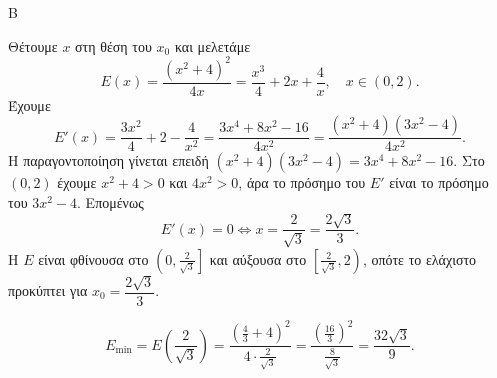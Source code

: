 \begin{thema}{Β}
\begin{erwthma}
\item Θέτουμε $x$ στη θέση του $x_0$ και μελετάμε
\[
E(x)=\frac{(x^2+4)^2}{4x}=\frac{x^3}{4}+2x+\frac4x,\quad x\in(0,2).
\]
Έχουμε
\[
E'(x)=\frac{3x^2}{4}+2-\frac{4}{x^2}
=\frac{3x^4+8x^2-16}{4x^2}
=\frac{(x^2+4)(3x^2-4)}{4x^2}.
\]
Η παραγοντοποίηση γίνεται επειδή $(x^2+4)(3x^2-4)=3x^4+8x^2-16$. Στο $(0,2)$ έχουμε $x^2+4>0$ και $4x^2>0$, άρα το πρόσημο του $E'$ είναι το πρόσημο του $3x^2-4$. Επομένως
\[
E'(x)=0\Leftrightarrow x=\frac{2}{\sqrt3}=\frac{2\sqrt3}{3}.
\]
Η $E$ είναι φθίνουσα στο $\left(0,\frac{2}{\sqrt3}\right]$ και αύξουσα στο $\left[\frac{2}{\sqrt3},2\right)$, οπότε το ελάχιστο προκύπτει για $x_0=\dfrac{2\sqrt3}{3}$.

\item
\[
E_{\min}=E\left(\frac{2}{\sqrt3}\right)
=\frac{\left(\frac43+4\right)^2}{4\cdot\frac{2}{\sqrt3}}
=\frac{\left(\frac{16}{3}\right)^2}{\frac{8}{\sqrt3}}
=\frac{32\sqrt3}{9}.
\]
\end{erwthma}
\end{thema}


